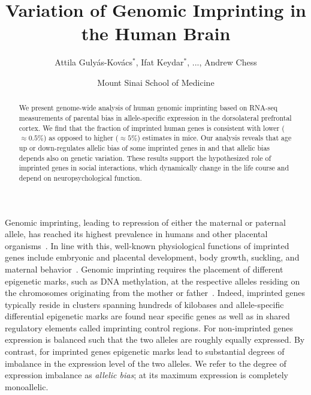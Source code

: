\documentclass[12pt,letterpaper]{article}
\title{Variation of Genomic Imprinting in the Human Brain}
\author{Attila Guly\'{a}s-Kov\'{a}cs\(^\ast\), Ifat Keydar\(^\ast\),
...,
Andrew Chess}
\date{Mount Sinai School of Medicine}
\begin{document}
\maketitle

\begin{abstract}
We present 
genome-wide analysis of human genomic imprinting based on
RNA-seq measurements of 
parental bias in allele-specific expression in the
dorsolateral prefrontal cortex.  We find that the fraction of imprinted human
genes is consistent with lower (\(\approx 0.5\%\)) as opposed to higher
(\(\approx 5\%\)) estimates in mice.  Our analysis reveals that age up or
down-regulates allelic bias of some imprinted genes
 in 
and
that allelic bias depends also on genetic variation.
These results support the
hypothesized role of imprinted genes in social interactions, which dynamically
change in the life course and depend on neuropsychological function.
\end{abstract}

\section{}

Genomic imprinting, leading to repression of either the maternal or paternal
allele, has reached its highest prevalence in humans and other placental
organisms~\cite{Renfree2012}.  In line with this, well-known physiological
functions of imprinted genes include embryonic and placental development, body
growth, suckling, and maternal behavior~\cite{Plasschaert2014,Peters2014}.
Genomic imprinting requires the placement of different epigenetic marks, such
as DNA methylation, at the respective alleles residing on the chromosomes
originating from the mother or father~\cite{Plasschaert2014}.  Indeed,
imprinted genes typically reside in clusters spanning hundreds of kilobases
and allele-specific differential epigenetic marks are found near specific
genes as well as in shared regulatory elements called imprinting control
regions. For non-imprinted genes expression is balanced such that the two
alleles are roughly equally expressed. By contrast, for imprinted genes
epigenetic marks lead to substantial\deleted{,} degrees of
imbalance in the expression level of the two alleles.  We refer to the degree
of expression imbalance as \emph{allelic bias}; at its maximum expression is
completely monoallelic.
\end{document}
